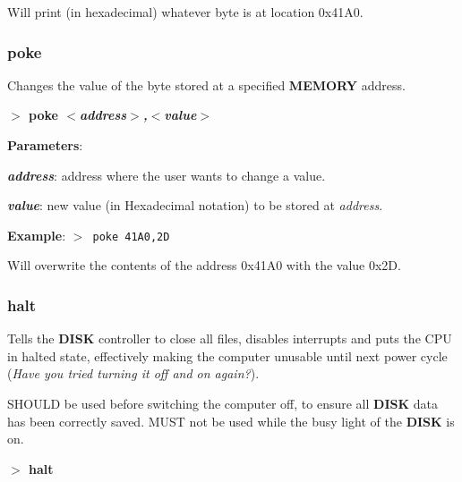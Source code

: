         Will print (in hexadecimal) whatever byte is at location 0x41A0.

        \subsubsection{{poke}}
        \label{cmd:poke}

        Changes the value of the byte stored at a specified \textbf{MEMORY}
        address.

        \hspace{1.9cm}\textbf{$>$ poke \textit{$<$address$>$,$<$value$>$}}

        \textbf{Parameters}:

        \hspace{1cm}\textbf{\textit{address}}: address where the user wants
        to change a value.
        
        \hspace{1cm}\textbf{\textit{value}}: new value (in Hexadecimal notation)
        to be stored at \textit{address}.

        \textbf{Example}: \texttt{$>$ poke 41A0,2D}

        Will overwrite the contents of the address 0x41A0 with the value
        0x2D.

        \subsubsection{{halt}}
        \label{cmd:halt}
        
        Tells the \textbf{DISK} controller to close all files, disables
        interrupts and puts the CPU in halted state, effectively making the
        computer unusable until next power cycle (\textit{Have you tried turning
        it off and on again?}).

        SHOULD be used before switching the computer off, to ensure all
        \textbf{DISK} data has been correctly saved. MUST not be used while the
        busy light of the \textbf{DISK} is on.

        \hspace{1.9cm}\textbf{$>$ halt}


